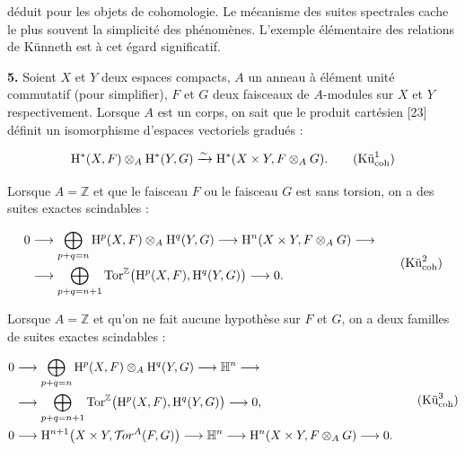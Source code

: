 %
déduit pour les objets de cohomologie. Le mécanisme des suites spectrales cache
le plus souvent la simplicité des phénomènes. L'exemple élémentaire des
relations de Künneth est à cet égard significatif.

\noindent\textbf{5.}\quad
Soient $X$ et $Y$ deux espaces compacts, $A$ un anneau à élément unité
commutatif (pour simplifier), $F$ et $G$ deux faisceaux de $A$-modules sur $X$
et $Y$ respectivement. Lorsque $A$ est un corps, on sait que le produit
cartésien [23] définit un isomorphisme d'espaces vectoriels gradués :

\begin{equation}
\mathrm H^*(X,F)\otimes_A\mathrm H^*(Y,G)
\xrightarrow{\sim}
\mathrm H^*(X\times Y,F\otimes_A G).
\tag{$\text{Kü}_{\mathrm{coh}}^{1}$}
\end{equation}

Lorsque $A=\mathbb Z$ et que le faisceau $F$ ou le faisceau $G$ est sans
torsion, on a des suites exactes scindables :

\begin{equation}
\begin{aligned}
0 &\longrightarrow
\bigoplus_{p+q=n}\mathrm H^p(X,F)\otimes_A\mathrm H^q(Y,G)
\longrightarrow \mathrm H^n(X\times Y,F\otimes_A G) \longrightarrow \\
&\longrightarrow
\bigoplus_{p+q=n+1}
\operatorname{Tor}^{\mathbb Z}\bigl(\mathrm H^p(X,F),\mathrm H^q(Y,G)\bigr)
\longrightarrow 0.
\end{aligned}
\tag{$\text{Kü}_{\mathrm{coh}}^{2}$}
\end{equation}

Lorsque $A=\mathbb Z$ et qu'on ne fait aucune hypothèse sur $F$ et $G$, on a
deux familles de suites exactes scindables :

\begin{equation}
\begin{aligned}
0 &\longrightarrow
\bigoplus_{p+q=n}\mathrm H^p(X,F)\otimes_A\mathrm H^q(Y,G)
\longrightarrow \mathbb H^n \longrightarrow \\
&\longrightarrow
\bigoplus_{p+q=n+1}
\operatorname{Tor}^{\mathbb Z}\bigl(\mathrm H^p(X,F),\mathrm H^q(Y,G)\bigr)
\longrightarrow 0, \\
0 &\longrightarrow
\mathrm H^{n+1}\bigl(X\times Y,\mathcal T\!or^A(F,G)\bigr)
\longrightarrow \mathbb H^n
\longrightarrow \mathrm H^n(X\times Y,F\otimes_A G)
\longrightarrow 0.
\end{aligned}
\tag{$\text{Kü}_{\mathrm{coh}}^{3}$}
\end{equation}

